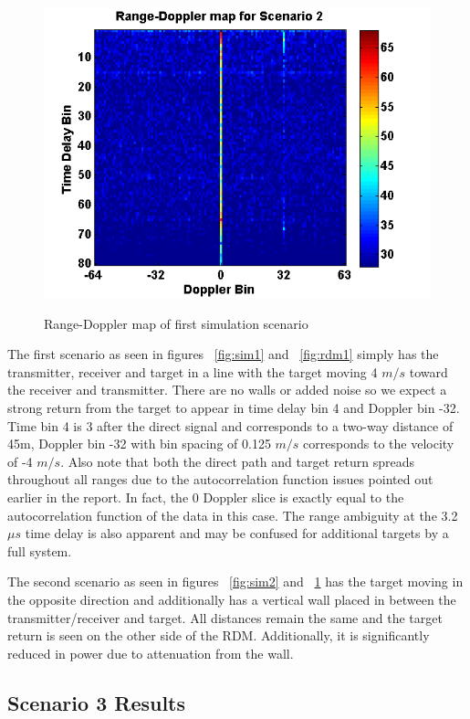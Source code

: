 \documentclass[article,11pt,onecolumn,final]{IEEEtran}
\begin{document}
\begin{figure}[H]
	\caption{Range-Doppler map of first simulation scenario}
	\centering
	\includegraphics[width=400pt]{figures/rdm2.png}
	\label{fig:rdm2}
\end{figure}

The first scenario as seen in figures ~\ref{fig:sim1} and ~\ref{fig:rdm1} simply has the transmitter, receiver and target in a line with the target moving 4 $m/s$ toward the receiver and transmitter. There are no walls or added noise so we expect a strong return from the target to appear in time delay bin 4 and Doppler bin -32. Time bin 4 is 3 after the direct signal and corresponds to a two-way distance of 45m, Doppler bin -32 with bin spacing of 0.125 $m/s$ corresponds to the velocity of -4 $m/s$. Also note that both the direct path and target return spreads throughout all ranges due to the autocorrelation function issues pointed out earlier in the report. In fact, the 0 Doppler slice is exactly equal to the autocorrelation function of the data in this case. The range ambiguity at the 3.2 $\mu s$ time delay is also apparent and may be confused for additional targets by a full system.

The second scenario as seen in figures ~\ref{fig:sim2} and ~\ref{fig:rdm2} has the target moving in the opposite direction and additionally has a vertical wall placed in between the transmitter/receiver and target. All distances remain the same and the target return is seen on the other side of the RDM. Additionally, it is significantly reduced in power due to attenuation from the wall.

\subsection{Scenario 3 Results}
\end{document}
